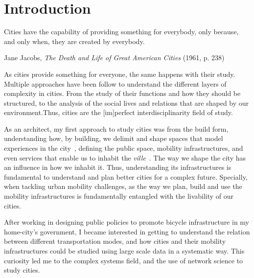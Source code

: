 \chapter{Introduction}

\epigraph{Cities have the capability of providing something for everybody, only because, and only when, they are created by everybody.}{Jane Jacobs, \textit{The Death and Life of Great American Cities} (1961, p. 238)}

As cities provide something for everyone, the same happens with their study. Multiple approaches have been follow to understand the different layers of complexity in cities. From the study of their functions and how they should be structured, to the analysis of the social lives and relations that are shaped by our environment.Thus, cities are the [im]perfect interdisciplinarity field of study.

As an architect, my first approach to study cities was from the build form, understanding how, by building, we delimit and shape spaces that model experiences in the city~\cite{ghel1971life}, defining the public space, mobility infrastructures, and even services that enable us to inhabit the \textit{ville}~\cite{sennett2018building}. The way we shape the city has an influence in how we inhabit it. Thus, understanding its infrastructures is fundamental to understand and plan better cities for a complex future. Specially, when tackling urban mobility challenges, as the way we plan, build and use the mobility infrastructures is fundamentally entangled with the livability of our cities.

After working in designing public policies to promote bicycle infrastructure in my home-city's government, I became interested in getting to understand the relation between different transportation modes, and how cities and their mobility infrastructures could be studied using large scale data in a systematic way. This curiosity led me to the complex systems field, and the use of network science to study cities.



